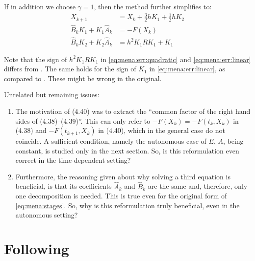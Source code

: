 If in addition we choose $\gamma=1$, then the method further simplifies to:
\begin{subequations}
\begin{align}
  X_{k+1} &= X_k + \tfrac{3}{2} h K_1 + \tfrac{1}{2} h K_2 \\
  \hat{B}_k K_1 + K_1 \hat{A}_k &= -F(X_k) \\
  \hat{B}_k K_2 + K_2 \hat{A}_k &= h^2 K_1RK_1 + K_1
  \label{eq:mena:err:linear}
\end{align}
\end{subequations}

Note that the sign of $h^2 K_1RK_1$ in
\eqref{eq:mena:err:quadratic} and \eqref{eq:mena:err:linear}
differs from \cite[Equations (4.43) and (4.47)]{Mena2007}.
The same holds for the sign of $K_1$
in \eqref{eq:mena:err:linear},
as compared to \cite[Equation (4.47)]{Mena2007}.
These might be wrong in the original.

Unrelated but remaining issues:
\begin{enumerate}
  \item
    The motivation of (4.40) was to extract the \enquote{common factor of the right hand sides of (4.38)--(4.39)}.
    This can only refer to $-F(X_k) = -F(t_k, X_k)$ in (4.38) and $-F(t_{k+1}, X_k)$ in (4.40),
    which in the general case do not coincide.
    A sufficient condition, namely the autonomous case of $E$, $A$, \etc being constant,
    is studied only in the next section.
    So, is this reformulation even correct in the time-dependent setting?
  \item
    Furthermore, the reasoning given about why solving a third equation is beneficial,
    is that its coefficients $\hat{A}_k$ and $\hat{B}_k$ are the same and, therefore, only one decomposition is needed.
    This is true even for the original form of \eqref{eq:mena:stages}.
    So, why is this reformulation truly beneficial, even in the autonomous setting?
\end{enumerate}

\section{Following \cite{MPIMD11-06}}

